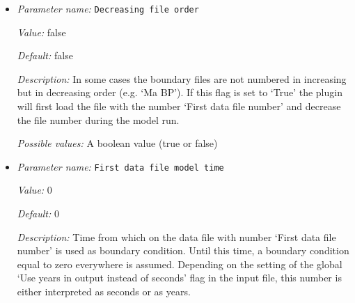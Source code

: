 \begin{itemize}
{\it Value:} 1e6


{\it Default:} 1e6


{\it Description:} Time step between following data files. Depending on the setting of the global `Use years in output instead of seconds' flag in the input file, this number is either interpreted as seconds or as years. The default is one million, i.e., either one million seconds or one million years.


{\it Possible values:} A floating point number $v$ such that $0 \leq v \leq \text{MAX\_DOUBLE}$
\item {\it Parameter name:} {\tt Decreasing file order}
\label{parameters:Boundary velocity model/Ascii data model/Decreasing file order}
\label{parameters:Boundary_20velocity_20model/Ascii_20data_20model/Decreasing_20file_20order}


{\it Value:} false


{\it Default:} false


{\it Description:} In some cases the boundary files are not numbered in increasing but in decreasing order (e.g. `Ma BP'). If this flag is set to `True' the plugin will first load the file with the number `First data file number' and decrease the file number during the model run.


{\it Possible values:} A boolean value (true or false)
\item {\it Parameter name:} {\tt First data file model time}
\label{parameters:Boundary velocity model/Ascii data model/First data file model time}
\label{parameters:Boundary_20velocity_20model/Ascii_20data_20model/First_20data_20file_20model_20time}


{\it Value:} 0


{\it Default:} 0


{\it Description:} Time from which on the data file with number `First data file number' is used as boundary condition. Until this time, a boundary condition equal to zero everywhere is assumed. Depending on the setting of the global `Use years in output instead of seconds' flag in the input file, this number is either interpreted as seconds or as years.



\end{itemize}
